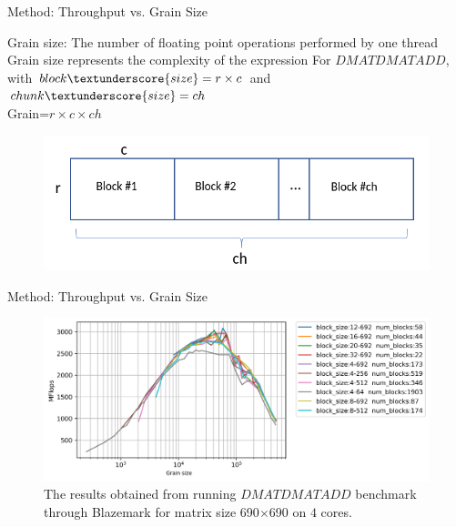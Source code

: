 \documentclass[10pt]{beamer}
\begin{document}
\begin{frame}{Method: Throughput vs. Grain Size}
	\begin{outline}
		Grain size: The number of floating point operations performed by one thread\\
		\1Grain size represents the complexity of the expression
		\1For $DMATDMATADD$, with $block\textunderscore{size}=r\times{c}$ and  $chunk\textunderscore{size}=ch$ \\ Grain=$r\times{c}\times{ch}$
		\begin{figure}[H]
			\centering\includegraphics[width=1\linewidth]{images/grain_size.png}
			
			\label{fig28}
		\end{figure}
	
	\end{outline}
\end{frame}

\begin{frame}{Method: Throughput vs. Grain Size}
	\begin{outline}
		\begin{figure}[H]
			\centering\includegraphics[width=1\linewidth]{images/fig6.png}
			\caption{The results obtained from running $DMATDMATADD$ benchmark through Blazemark for matrix size 690$\times$690 on $4$ cores.}	
			\label{fig6}
		\end{figure}
	
	\end{outline}
\end{frame}
\end{document}
